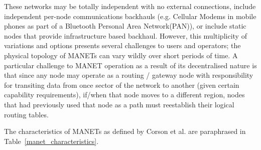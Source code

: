 These networks may be totally independent with no external connections, include independent per-node communications backhauls (e.g. Cellular Modems in mobile phones as part of a Bluetooth Personal Area Network(PAN)), or include static nodes that provide infrastructure based backhaul. 
However, this multiplicity of variations and options presents several challenges to users and operators; the physical topology of MANETs can vary wildly over short periods of time. 
A particular challenge to MANET operation as a result of its decentralised nature is that since any node may operate as a routing / gateway node with responsibility for transiting data from once sector of the network to another (given certain capability requirements), if/when that node moves to a different region, nodes that had previously used that node as a path must reestablish their logical routing tables. 

The characteristics of MANETs as defined by Corson et al. are paraphrased in Table~\ref{manet_characteristics}.

